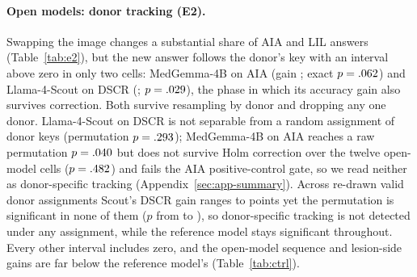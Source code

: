 \documentclass[11pt]{article}
\begin{document}
\paragraph{Open models: donor tracking (E2).} Swapping the image changes a substantial share of AIA and LIL answers (Table~\ref{tab:e2}), but the new answer follows the donor's key with an interval above zero in only two cells: MedGemma-4B on AIA (gain \vfourEtwoGainAIAMedGemma{}; exact $p=.062{}$) and Llama-4-Scout on DSCR (\vfourEtwoGainDSCRScout{}; $p=.029{}$), the phase in which its accuracy gain also survives correction. Both survive resampling by donor and dropping any one donor. Llama-4-Scout on DSCR is not separable from a random assignment of donor keys (permutation $p=.293{}$); MedGemma-4B on AIA reaches a raw permutation $p=.040{}$ but does not survive Holm correction over the twelve open-model cells ($p=.482{}$) and fails the AIA positive-control gate, so we read neither as donor-specific tracking (Appendix~\ref{sec:app-summary}). Across \vfourRobustScoutNAssign{} re-drawn valid donor assignments Scout's DSCR gain ranges \vfourRobustScoutDSCRGainMin{} to \vfourRobustScoutDSCRGainMax{} points yet the permutation is significant in none of them ($p$ from \vfourRobustScoutDSCRPermPMin{} to \vfourRobustScoutDSCRPermPMax{}), so donor-specific tracking is not detected under any assignment, while the reference model stays significant throughout. Every other interval includes zero, and the open-model sequence and lesion-side gains are far below the reference model's (Table~\ref{tab:ctrl}).
\end{document}
